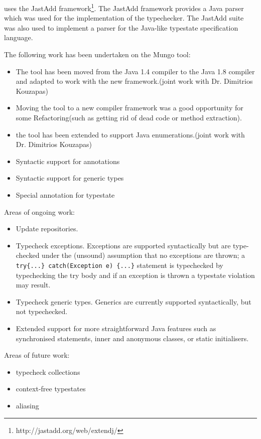 \Mungo uses the JastAdd framework\footnote{http://jastadd.org/web/extendj/}\cite{jastadd}. The JastAdd framework provides a Java parser
which was used for the implementation of the \Mungo typechecker. The JastAdd suite was also used to implement a parser
for the Java-like typestate specification language.

The following work has been undertaken on the Mungo tool:
\begin{itemize}
  \item The tool has been moved from the Java 1.4 compiler to the Java 1.8 compiler and adapted to work with the new framework.(joint work with Dr. Dimitrios Kouzapas)
  \item Moving the tool to a new compiler framework was a good opportunity for some Refactoring(such as getting rid of dead code or method extraction).
  \item the tool has been extended to support Java enumerations.(joint work with Dr. Dimitrios Kouzapas)
  \item Syntactic support  for annotations
  \item Syntactic support for generic types
  \item Special annotation for typestate
\end{itemize}

Areas of ongoing work:
\begin{itemize}
  \item Update repositories.
  \item Typecheck exceptions.
  Exceptions are supported syntactically but are type-checked under
  the (unsound) assumption that no exceptions are thrown;
  a \lstinline|try{...} catch(Exception e) {...}| statement is typechecked by
  typechecking the try body and if an exception is thrown a typestate violation may result.
  \item Typecheck generic types.
  Generics are currently supported syntactically, but not typechecked.
  \item Extended support for more straightforward Java features such as synchronised statements,
  inner and anonymous classes, or static initialisers.
\end{itemize}

Areas of future work:
\begin{itemize}
  \item typecheck collections
  \item context-free typestates
  \item aliasing
\end{itemize}

